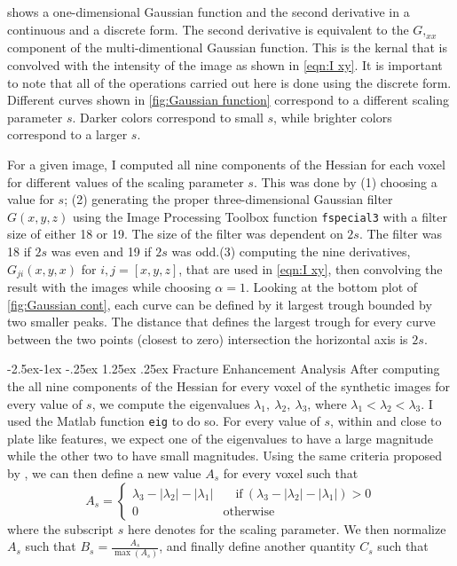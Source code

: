 \documentclass{edger}
\makeatletter
\renewcommand\paragraph{\@startsection{paragraph}{4}{\z@}%
            {-2.5ex\@plus -1ex \@minus -.25ex}%
            {1.25ex \@plus .25ex}%
            {\normalfont\normalsize\bfseries}}
\makeatother
\begin{document}
 shows a one-dimensional Gaussian function and the second derivative in a continuous and a discrete form. The second derivative is equivalent to the $G,_{xx}$ component of the multi-dimentional Gaussian function. This is the kernal that is convolved with the intensity of the image as shown in \autoref{eqn:I xy}. It is important to note that all of the operations carried out here is done using the discrete form. Different curves shown in \autoref{fig:Gaussian function} correspond to a different scaling parameter $s$. Darker colors correspond to small $s$, while brighter colors correspond to a larger $s$. 

For a given image, I computed all nine components of the Hessian for each voxel for different values of the scaling parameter $s$. This was done by (1) choosing a value for $s$; (2) generating the proper three-dimensional Gaussian filter $G(x,y,z)$ using the   Image Processing Toolbox function \texttt{fspecial3} with a filter size of either 18 or 19. The size of the filter was dependent on $2s$. The filter was 18 if $2s$ was even and 19 if $2s$ was odd.(3) computing the nine derivatives, $G_{ji}(x,y,x)$ for $i,j = [x,y,z]$, that are used in \autoref{eqn:I xy}, then convolving the result with the images while choosing $\alpha = 1$. Looking at the bottom plot of \autoref{fig:Gaussian cont}, each curve can be defined by it largest trough bounded by two smaller peaks. The distance that defines the largest trough for every curve between the two points (closest to zero) intersection the horizontal axis is $2s$. 

\paragraph{Fracture Enhancement Analysis} \label{sec:Fracture Enhancement Analysis}
After computing the all nine components of the Hessian for every voxel of the synthetic images for every value of $s$, we compute the eigenvalues $\lambda_1,~ \lambda_2,~\lambda_3$, where $\lambda_1 < \lambda_2 < \lambda_3$. I used the Matlab function \texttt{eig} to do so. For every value of $s$, within and close to plate like features, we expect one of the eigenvalues to have a large magnitude while the other two to have small magnitudes. Using the same criteria proposed by \cite{Voorn2013}, we can then define a new value $A_s$ for every voxel such that 
$$A_s = \begin{cases}
\lambda_3 - |\lambda_2| - |\lambda_1| &\quad \text{if} ~ (\lambda_3 - |\lambda_2| - |\lambda_1|) > 0\\
0 \qquad &\text{otherwise}
\end{cases} $$
where the subscript $s$ here denotes for the scaling parameter. We then normalize $A_s$ such that $B_s = \frac{A_s}{\max(A_s)}$, and finally define another quantity $C_s$ such that 
\end{document}
